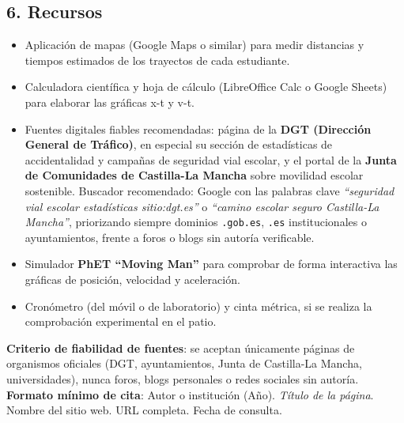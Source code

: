 \documentclass[11pt,a4paper]{article}
\begin{document}
\subsection*{6. Recursos}
\begin{itemize}
    \item Aplicación de mapas (Google Maps o similar) para medir distancias y tiempos estimados de los trayectos de cada estudiante.
    \item Calculadora científica y hoja de cálculo (LibreOffice Calc o Google Sheets) para elaborar las gráficas x-t y v-t.
    \item Fuentes digitales fiables recomendadas: página de la \textbf{DGT (Dirección General de Tráfico)}, en especial su sección de estadísticas de accidentalidad y campañas de seguridad vial escolar, y el portal de la \textbf{Junta de Comunidades de Castilla-La Mancha} sobre movilidad escolar sostenible. Buscador recomendado: Google con las palabras clave \textit{``seguridad vial escolar estadísticas sitio:dgt.es''} o \textit{``camino escolar seguro Castilla-La Mancha''}, priorizando siempre dominios \texttt{.gob.es}, \texttt{.es} institucionales o ayuntamientos, frente a foros o blogs sin autoría verificable.
    \item Simulador \textbf{PhET ``Moving Man''} para comprobar de forma interactiva las gráficas de posición, velocidad y aceleración.
    \item Cronómetro (del móvil o de laboratorio) y cinta métrica, si se realiza la comprobación experimental en el patio.
\end{itemize}
\textbf{Criterio de fiabilidad de fuentes}: se aceptan únicamente páginas de organismos oficiales (DGT, ayuntamientos, Junta de Castilla-La Mancha, universidades), nunca foros, blogs personales o redes sociales sin autoría. \textbf{Formato mínimo de cita}: Autor o institución (Año). \textit{Título de la página}. Nombre del sitio web. URL completa. Fecha de consulta.
\end{document}
